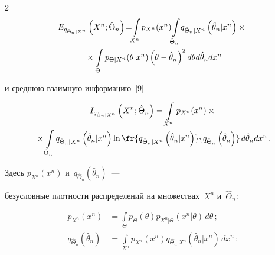 \begin{multicols}{2}
\begin{multline}
\!\!E_{q_{\hat{\Theta}_n\vert X^n}}\left(X^n;\hat{\Theta}_n\right)\! =\!\!


\int\limits_{X^n} \!p_{X^n}(x^n) \!


\int\limits_{\hat{\Theta}_n} \! q_{\hat{\Theta}_n \vert X^n} \left(\hat{\theta}_n\vert x^n\right)\times{}\hspace*{-0.3pt}\\


{}\times \int\limits_{\Theta} 


p_{\Theta\vert X^n}(\theta\vert x^n)\left(\theta - \hat{\theta}_n\right)^2 d\theta d\hat{\theta}_n dx^n


\label{e1-lan}


\end{multline}


и среднюю взаимную информацию~[9]


\begin{multline}


I_{q_{\hat{\Theta}_n\vert X^n}} \left( X^n; \hat{\Theta}_n\right) =


\int\limits_{X^n} p_{X^n}(x^n) \times{}\\


{}\times


\int\limits_{\hat{\Theta}_n} q_{\hat{\Theta}_n\vert X^n} \left( \hat{\theta}_n\vert x^n\right) 


\ln\fr{q_{\hat{\Theta}_n\vert X^n} \left(\hat{\theta}_n\vert x^n\right)}{q_{\hat{\Theta}_n} 


\left(\hat{\theta}_n\right)}\,d\hat{\theta}_n dx^n\,.


\label{e2-lan}


\end{multline}


Здесь $p_{X^n}(x^n)$ и~$q_{\hat{\Theta}_n} ( \hat{\theta}_n)$~--- 


безусловные плотности распределений на множествах~$X^n$ и~$\hat{\Theta}_n$:


\begin{align*}


p_{X^n}(x^n) &= \int\limits_{\Theta} p_\Theta(\theta) p_{X^n\vert \Theta} \left( 


x^n\vert\theta\right)\,d\theta\,;\\


q_{\hat{\Theta}_n} \left( \hat{\theta}_n\right) &= \int\limits_{X^n} p_{X^n}\left( x^n\right) 


q_{\hat{\Theta}_n\vert X^n} \left( \hat{\theta}_n\vert x^n\right)\,dx^n\,;



\end{align*}
\end{multicols}
